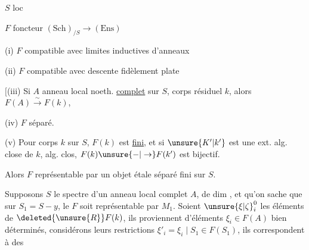 
$S$  loc 

$F$ foncteur \quad $(\mathrm{Sch})_{/S}\longrightarrow(\mathrm{Ens})$

(i) $F$ compatible avec limites inductives d'anneaux

(ii) $F$ compatible avec descente fidèlement plate  

$\bigl[$(iii) Si $A$ anneau local noeth. \uline{complet} sur $S$,
corps résiduel $k$, alors $F(A)\overset{\sim}{\longrightarrow}F(k)$,

(iv) $F$ séparé.

(v) Pour  corps $k$ sur $S$, $F(k)$ est \uline{fini},
et si $\unsure{K'|k'}$ est une ext. alg. close de $k$,  alg. clos,
$F(k)\unsure{-|\to}F(k')$ est bijectif.

Alors $F$ représentable par un  objet
étale  séparé  fini sur $S$.


Supposons $S$ le spectre d'un anneau local complet
$A$,   de dim , et qu'on sache
que sur $S_1=S-y$, le  $F$ soit représentable
par $M_1$.  Soient
$\unsure{\xi|\zeta}_i^0$   les éléments de $\deleted{\unsure{R}}F(k)$, ils proviennent d'éléments
$\xi_i\in F(A)$ bien déterminés, considérons leurs
restrictions $\xi'_i=\xi_i\mid S_1\in F(S_1)$, ils correspondent à des
